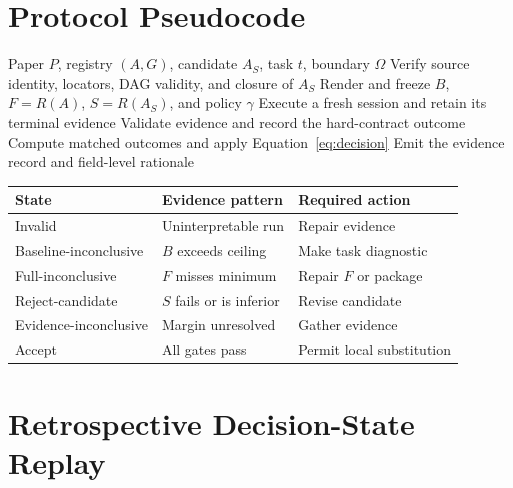 \appendix

\section{Protocol Pseudocode}
\label{app:pseudocode}

\begin{algorithm}[h]
\caption{SkillAudit for one fixed candidate}
\label{alg:skillaudit}
\begin{algorithmic}[1]
\REQUIRE Paper $P$, registry $(A,G)$, candidate $A_S$, task $t$, boundary $\Omega$
\STATE Verify source identity, locators, DAG validity, and closure of $A_S$
\STATE Render and freeze $B$, $F=R(A)$, $S=R(A_S)$, and policy $\gamma$
    \STATE Execute a fresh session and retain its terminal evidence
    \STATE Validate evidence and record the hard-contract outcome
\ENDFOR
\STATE Compute matched outcomes and apply Equation~\ref{eq:decision}
\STATE Emit the evidence record and field-level rationale
\end{algorithmic}
\end{algorithm}

\begin{center}
\label{tab:decision-semantics}
\footnotesize
\setlength{\tabcolsep}{2pt}
\begin{tabular}{>{\raggedright\arraybackslash}p{}>{\raggedright\arraybackslash}p{}>{\raggedright\arraybackslash}p{}}
\toprule
State & Evidence pattern & Required action \\
\midrule
Invalid & Uninterpretable run & Repair evidence \\
Baseline-inconclusive & $B$ exceeds ceiling & Make task diagnostic \\
Full-inconclusive & $F$ misses minimum & Repair $F$ or package \\
Reject-candidate & $S$ fails or is inferior & Revise candidate \\
Evidence-inconclusive & Margin unresolved & Gather evidence \\
Accept & All gates pass & Permit local substitution \\
\bottomrule
\end{tabular}
\end{center}

\section{Retrospective Decision-State Replay}
\label{app:decision-replay}


